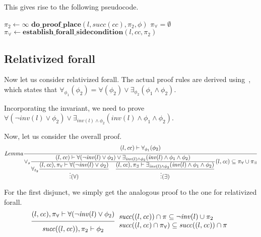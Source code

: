 \documentclass{article}
\newcommand{\proofrule}[3][]{#1 \frac{\raisebox{.7ex}{\normalsize{$#2$}}}
  {\raisebox{-1.0ex}{\normalsize{$#3$}}}}
\newcommand{\placeholder}[1][]{\pi_{#1}}
\newcommand{\loc}{l}
\newcommand{\region}{\mathit{cc}}
\newcommand{\suc}{\mathit{succ}}
\newcommand{\inv}{\mathit{inv}}
\newcommand{\method}[1]{\ensuremath{\mathbf{#1}}}
\begin{document}
This gives rise to the following pseudocode.
\begin{algorithm}[H]
\caption{$\method{do\_proof\_place\_forall}(\loc, \region, \placeholder[\forall], \forall(\phi))$}
\begin{algorithmic}
\STATE $\placeholder[2] \gets \infty$
\STATE $\method{do\_proof\_place}(\loc, \suc(\region), \placeholder[2], \phi)$
\IF{$\placeholder[2] = \emptyset$}
  \STATE $\placeholder[\forall] = \emptyset$
\ELSE
  \STATE $\placeholder[\forall] \gets \method{establish\_forall\_sidecondition}(\loc, \region, \placeholder[2])$
\ENDIF
\end{algorithmic}
\end{algorithm}

\subsection{Relativized forall}

Now let us consider relativized forall. The actual proof rules are derived using~\cite[Lemma 1]{FC:14}, which states that $\forall_{\phi_1}(\phi_2) = \forall(\phi_2) \lor \exists_{\phi_2}(\phi_1 \land \phi_2)$.

Incorporating the invariant, we need to prove $\forall(\lnot \inv(\loc) \lor \phi_2) \lor \exists_{\inv(\loc) \land \phi_2}(\inv(\loc) \land \phi_1 \land \phi_2)$.

Now, let us consider the overall proof.
\[
\proofrule[\mathit{Lemma}]
{(\loc, \region) \vdash \forall_{\phi_1}(\phi_2)}
{
  \proofrule[\lor_s]
  {(\loc, \region) \vdash \forall(\lnot \inv(\loc) \lor \phi_2) \lor \exists_{\inv(\loc) \land \phi_2}(\inv(\loc) \land \phi_1 \land \phi_2)}
  {
    \proofrule[\forall_{t_2}]
    {(\loc, \region), \placeholder[\forall] \vdash \forall(\lnot \inv(\loc) \lor \phi_2)}
    {\vdots (\forall)}
    \quad
    \proofrule
    {(\loc, \region), \placeholder[\exists] \vdash \exists_{\inv(\loc) \land \phi_2}(\inv(\loc) \land \phi_1 \land \phi_2)}
    {\vdots (\exists)}
  }
  (\loc, \region) \subseteq \placeholder[\forall] \cup \placeholder[\exists]
}
\]

For the first disjunct, we simply get the analogous proof to the one for relativized forall.
\[
\proofrule
  {(\loc, \region), \placeholder[\forall] \vdash \forall(\lnot \inv(\loc) \lor \phi_2)}
  {\suc((\loc, \region)), \placeholder[2] \vdash \phi_2}
  \begin{array}{l}
    \suc((\loc, \region)) \cap \placeholder \subseteq \lnot \inv(\loc) \cup \placeholder[2]\\
    \suc((\loc, \region) \cap \placeholder[\forall]) \subseteq \suc((\loc, \region)) \cap \placeholder 
  \end{array}
\]
\end{document}
